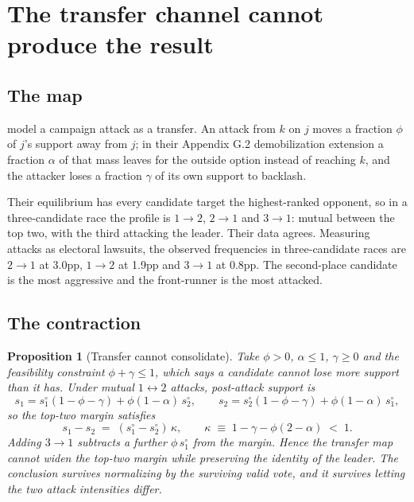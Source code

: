\documentclass[11pt]{article}
\newtheorem{proposition}{Proposition}
\theoremstyle{definition}
\theoremstyle{remark}
\begin{document}
\section{The transfer channel cannot produce the result}
\label{sec:foil}

\subsection{The map}

\citet{nakaguma2025} model a campaign attack as a transfer. An attack from $k$
on $j$ moves a fraction $\phi$ of $j$'s support away from $j$; in their
Appendix G.2 demobilization extension a fraction $\alpha$ of that mass leaves
for the outside option instead of reaching $k$, and the attacker loses a
fraction $\gamma$ of its own support to backlash.

Their equilibrium has every candidate target the highest-ranked opponent, so
in a three-candidate race the profile is $1 \to 2$, $2 \to 1$ and $3 \to 1$:
mutual between the top two, with the third attacking the leader. Their data
agrees. Measuring attacks as electoral lawsuits, the observed frequencies in
three-candidate races are $2 \to 1$ at 3.0pp, $1 \to 2$ at 1.9pp and
$3 \to 1$ at 0.8pp. The second-place candidate is the most aggressive and the
front-runner is the most attacked.

\subsection{The contraction}

\begin{proposition}[Transfer cannot consolidate]
\label{prop:foil}
Take $\phi > 0$, $\alpha \le 1$, $\gamma \ge 0$ and the feasibility constraint
$\phi + \gamma \le 1$, which says a candidate cannot lose more support than it
has. Under mutual $1 \leftrightarrow 2$ attacks, post-attack support is
\[
  s_1 = s^\circ_1(1 - \phi - \gamma) + \phi(1-\alpha)\,s^\circ_2,
  \qquad
  s_2 = s^\circ_2(1 - \phi - \gamma) + \phi(1-\alpha)\,s^\circ_1,
\]
so the top-two margin satisfies
\[
  s_1 - s_2 \;=\; (s^\circ_1 - s^\circ_2)\,\kappa,
  \qquad
  \kappa \;\equiv\; 1 - \gamma - \phi(2-\alpha) \;<\; 1 .
\]
Adding $3 \to 1$ subtracts a further $\phi\,s^\circ_1$ from the margin. Hence
the transfer map cannot widen the top-two margin while preserving the identity
of the leader. The conclusion survives normalizing by the surviving valid
vote, and it survives letting the two attack intensities differ.
\end{proposition}
\end{document}
